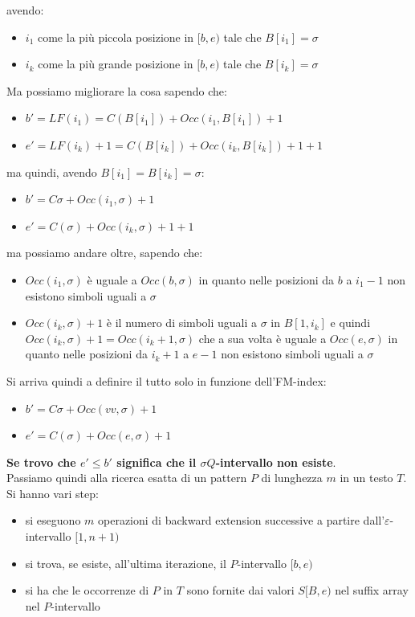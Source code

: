 \documentclass[a4paper,12pt, oneside]{book}
\begin{document}
avendo:
\begin{itemize}
  \item $i_1$ come la più piccola posizione in $[b,e)$ tale che $B[i_1]=\sigma$
  \item $i_k$ come la più grande posizione in $[b,e)$ tale che $B[i_k]=\sigma$
\end{itemize}
Ma possiamo migliorare la cosa sapendo che:
\begin{itemize}
  \item $b'=LF(i_1)=C(B[i_1])+Occ(i_1,B[i_1])+1$
  \item $e'=LF(i_k)+1=C(B[i_k])+Occ(i_k,B[i_k])+1+1$
\end{itemize}
ma quindi, avendo $B[i_1]=B[i_k]=\sigma$:
\begin{itemize}
  \item $b'=C\sigma+Occ(i_1,\sigma)+1$
  \item $e'=C(\sigma)+Occ(i_k,\sigma)+1+1$
\end{itemize}
ma possiamo andare oltre, sapendo che:
\begin{itemize}
  \item $Occ(i_1,\sigma)$ è uguale a $Occ(b,\sigma)$ in quanto nelle posizioni
  da $b$ a $i_1-1$ non esistono simboli uguali a $\sigma$
  \item $Occ(i_k,\sigma)+1$ è il numero di simboli uguali a $\sigma$ in
  $B[1,i_k]$ e quindi $Occ(i_k,\sigma)+1=Occ(i_k+1,\sigma)$ che a sua volta è
  uguale a $Occ(e,\sigma)$ in quanto nelle posizioni
  da $i_k+1$ a $e-1$ non esistono simboli uguali a $\sigma$
\end{itemize}
Si arriva quindi a definire il tutto solo in funzione dell'FM-index:
\begin{itemize}
  \item $b'=C\sigma+Occ(vv,\sigma)+1$
  \item $e'=C(\sigma)+Occ(e,\sigma)+1$
\end{itemize}
\textbf{Se trovo che $e'\leq b'$ significa che il $\sigma Q$-intervallo non
  esiste}.\\
Passiamo quindi alla ricerca esatta di un pattern $P$ di lunghezza $m$ in un
testo $T$. Si hanno vari step:
\begin{itemize}
  \item si eseguono $m$ operazioni di backward extension successive a partire
  dall'$\varepsilon$-intervallo $[1,n+1)$
  \item si trova, se esiste, all'ultima iterazione, il $P$-intervallo $[b,e)$
  \item si ha che le occorrenze di $P$ in $T$ sono fornite dai valori $S[B,e)$
  nel suffix array nel $P$-intervallo
\end{itemize}
\end{document}

